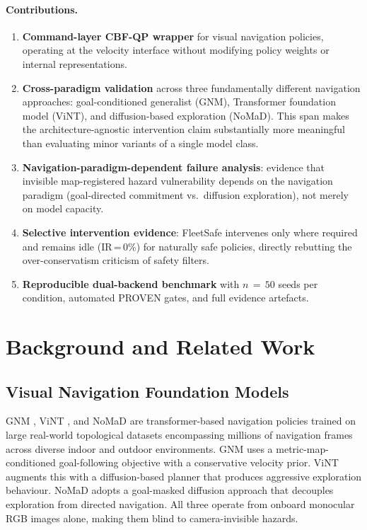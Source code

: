 \documentclass[letterpaper]{article}
\begin{document}
\paragraph{Contributions.}
\begin{enumerate}
  \item \textbf{Command-layer CBF-QP wrapper} for visual navigation policies,
    operating at the velocity interface without modifying policy weights or
    internal representations.
  \item \textbf{Cross-paradigm validation} across three fundamentally different
    navigation approaches: goal-conditioned generalist (GNM), Transformer
    foundation model (ViNT), and diffusion-based exploration (NoMaD).
    This span makes the architecture-agnostic intervention claim substantially
    more meaningful than evaluating minor variants of a single model class.
  \item \textbf{Navigation-paradigm-dependent failure analysis}: evidence that
    invisible map-registered hazard vulnerability depends on the navigation
    paradigm (goal-directed commitment vs.\ diffusion exploration), not merely
    on model capacity.
  \item \textbf{Selective intervention evidence}: FleetSafe intervenes only
    where required and remains idle (IR\,=\,0\%) for naturally safe policies,
    directly rebutting the over-conservatism criticism of safety filters.
  \item \textbf{Reproducible dual-backend benchmark} with $n\,{=}\,50$ seeds per
    condition, automated PROVEN gates, and full evidence artefacts.
\end{enumerate}

\section{Background and Related Work}
\label{sec:related}

\subsection{Visual Navigation Foundation Models}
GNM \cite{shah2023gnm}, ViNT \cite{majumdar2023vint}, and NoMaD
\cite{sridhar2024nomad} are transformer-based navigation policies
trained on large real-world topological datasets encompassing millions
of navigation frames across diverse indoor and outdoor environments.
GNM uses a metric-map-conditioned goal-following objective with a
conservative velocity prior. ViNT augments this with a diffusion-based
planner that produces aggressive exploration behaviour. NoMaD adopts a
goal-masked diffusion approach that decouples exploration from directed
navigation. All three operate from onboard monocular RGB images alone,
making them blind to camera-invisible hazards.
\end{document}
